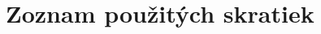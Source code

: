 \documentclass[12pt,twoside,a4paper]{book}   %
\begin{document}
\cleardoublepage

\cleardoublepage

\cleardoublepage

\cleardoublepage

\cleardoublepage

\cleardoublepage



%
{
\def\CS{$\cal C\kern-0.1667em\lower.5ex\hbox{$\cal S$}\kern-0.075em $}

}

%


\appendix

\cleardoublepage\chapter{Zoznam použitých skratiek}
\end{document}
